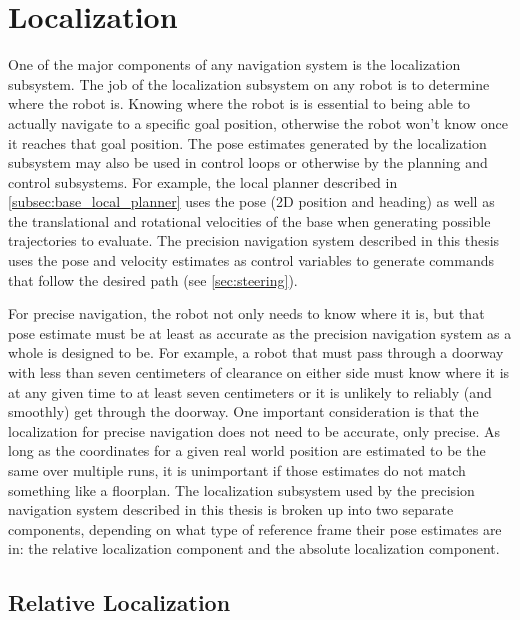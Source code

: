 \section{Localization}\label{sec:localization}

One of the major components of any navigation system is the localization subsystem. The job of the localization subsystem on any robot is to determine where the robot is. Knowing where the robot is is essential to being able to actually navigate to a specific goal position, otherwise the robot won't know once it reaches that goal position. The pose estimates generated by the localization subsystem may also be used in control loops or otherwise by the planning and control subsystems. For example, the local planner described in \autoref{subsec:base_local_planner} uses the pose (2D position and heading) as well as the translational and rotational velocities of the base when generating possible trajectories to evaluate. The precision navigation system described in this thesis uses the pose and velocity estimates as control variables to generate commands that follow the desired path (see \autoref{sec:steering}).

For precise navigation, the robot not only needs to know where it is, but that pose estimate must be at least as accurate as the precision navigation system as a whole is designed to be. For example, a robot that must pass through a doorway with less than seven centimeters of clearance on either side must know where it is at any given time to at least seven centimeters or it is unlikely to reliably (and smoothly) get through the doorway. One important consideration is that the localization for precise navigation does not need to be accurate, only precise. As long as the coordinates for a given real world position are estimated to be the same over multiple runs, it is unimportant if those estimates do not match something like a floorplan. The localization subsystem used by the precision navigation system described in this thesis is broken up into two separate components, depending on what type of reference frame their pose estimates are in: the relative localization component and the absolute localization component.

\subsection{Relative Localization}\label{subsec:relative_localization}

